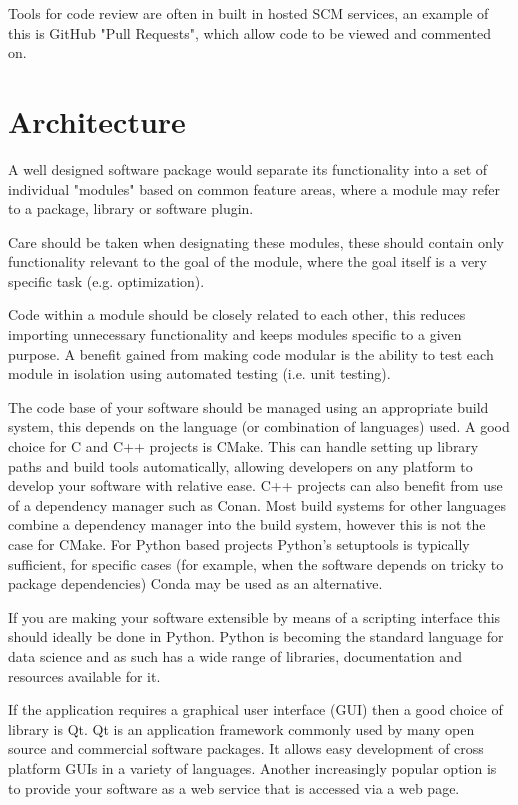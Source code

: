 \documentclass[jnr]{iosart2x}
\begin{document}
Tools for code review are often in built in hosted SCM services, an example of this is GitHub "Pull Requests", which allow code to be viewed and commented on.

\section{Architecture}
\label{Architecture}

A well designed software package would separate its functionality into a set of individual "modules" based on common feature areas, where a module may refer to a package, library or software plugin.

Care should be taken when designating these modules, these should contain only functionality relevant to the goal of the module, where the goal itself is a very specific task (e.g. optimization).

Code within a module should be closely related to each other, this reduces importing unnecessary functionality and keeps modules specific to a given purpose.
A benefit gained from making code modular is the ability to test each module in isolation using automated testing (i.e. unit testing).

The code base of your software should be managed using an appropriate build system, this depends on the language (or combination of languages) used.
A good choice for C and C++ projects is CMake.
This can handle setting up library paths and build tools automatically, allowing developers on any platform to develop your software with relative ease.
C++ projects can also benefit from use of a dependency manager such as Conan.
Most build systems for other languages combine a dependency manager into the build system, however this is not the case for CMake.
For Python based projects Python's setuptools is typically sufficient, for specific cases (for example, when the software depends on tricky to package dependencies) Conda may be used as an alternative.

If you are making your software extensible by means of a scripting interface this should ideally be done in Python.
Python is becoming the standard language for data science and as such has a wide range of libraries, documentation and resources available for it.

If the application requires a graphical user interface (GUI) then a good choice of library is Qt.
Qt is an application framework commonly used by many open source and commercial software packages.
It allows easy development of cross platform GUIs in a variety of languages.
Another increasingly popular option is to provide your software as a web service that is accessed via a web page.
\end{document}
